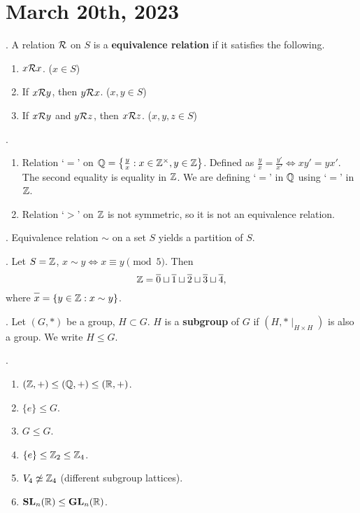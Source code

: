 \section*{March 20th, 2023}

.  A relation \(\mathcal{R}\) on \(S\) is a \textbf{equivalence relation} if it satisfies the following.
\begin{enumerate}
    \item {} \(x \mathcal{R} x\). (\(x \in S\))
    \item {} If \(x \mathcal{R} y\), then \(y \mathcal{R} x\). (\(x, y \in S\))
    \item {} If \(x \mathcal{R} y\) and \(y \mathcal{R} z\), then \(x \mathcal{R} z\). (\(x, y, z \in S\))
\end{enumerate}

\ex.
\begin{enumerate}
    \item Relation `\(=\)' on \(\mathbb{Q} = \left\{\frac{y}{x} : x \in \mathbb{Z}^\times, y \in \mathbb{Z}\right\}\). Defined as \(\frac{y}{x} = \frac{y'}{x'} \iff xy' = yx'\). The second equality is equality in \(\mathbb{Z}\). We are defining `\(=\)' in \(\mathbb{Q}\) using `\(=\)' in \(\mathbb{Z}\).
    \item Relation `\(>\)' on \(\mathbb{Z}\) is not symmetric, so it is not an equivalence relation.
\end{enumerate}

\thm. Equivalence relation \(\sim\) on a set \(S\) yields a partition of \(S\).

\ex. Let \(S = \mathbb{Z}\), \(x \sim y \iff x \equiv y \pmod 5\). Then
\[
    \Z = \bar{0} \sqcup \bar{1} \sqcup \bar{2} \sqcup \bar{3} \sqcup \bar{4},
\]
where \(\bar{x} = \{y \in \Z : x \sim y\}\).


.  Let \((G, *)\) be a group, \(H \subset G\). \(H\) is a \textbf{subgroup} of \(G\) if \((H, * \mid_{H\times H})\) is also a group. We write \(H \leq G\).

\ex.
\begin{enumerate}
    \item \((\mathbb{Z}, +) \leq (\mathbb{Q}, +) \leq (\mathbb{R}, +)\).
    \item {} \(\{e\} \leq G\).
    \item {} \(G \leq G\).
    \item \(\{e\} \leq \mathbb{Z}_2 \leq \mathbb{Z}_4\).
    \item \(V_4 \not\simeq \mathbb{Z}_4\) (different subgroup lattices).
    \item \(\mathbf{SL}_n(\mathbb{R}) \leq \mathbf{GL}_n(\mathbb{R})\).
\end{enumerate}

